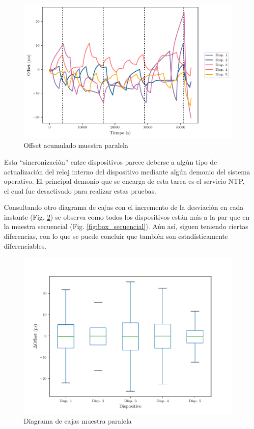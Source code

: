 \begin{figure}[htpb!]
    \centering
    \includegraphics{../Python/plots/parallel/offset_plot}
    \caption{Offset acumulado muestra paralela}
    \label{fig:off_acu_paralelo}
\end{figure}

Esta ``sincronización'' entre dispositivos parece deberse a algún tipo de actualización del reloj interno del dispositivo mediante algún demonio del sistema operativo. El principal demonio que se encarga de esta tarea es el servicio NTP, el cual fue desactivado para realizar estas pruebas. 

Consultando otro diagrama de cajas con el incremento de la desviación en cada instante (Fig. \ref{fig:box_paralelo}) se observa como todos los dispositivos están más a la par que en la muestra secuencial (Fig. \ref{fig:box_secuencial}). Aún así, siguen teniendo ciertas diferencias, con lo que se puede concluir que también son estadísticamente diferenciables.

\begin{figure}[htpb!]
    \centering
    \includegraphics{../Python/plots/parallel/boxplot_no_out}
    \caption{Diagrama de cajas muestra paralela}
    \label{fig:box_paralelo}
\end{figure}


